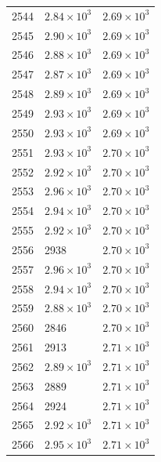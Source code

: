 \begin{table}[H]
\begin{tabular}{lll}
2544 & $\displaystyle 2.84 \times 10^{3}$ & $\displaystyle 2.69 \times 10^{3}$ \\
2545 & $\displaystyle 2.90 \times 10^{3}$ & $\displaystyle 2.69 \times 10^{3}$ \\
2546 & $\displaystyle 2.88 \times 10^{3}$ & $\displaystyle 2.69 \times 10^{3}$ \\
2547 & $\displaystyle 2.87 \times 10^{3}$ & $\displaystyle 2.69 \times 10^{3}$ \\
2548 & $\displaystyle 2.89 \times 10^{3}$ & $\displaystyle 2.69 \times 10^{3}$ \\
2549 & $\displaystyle 2.93 \times 10^{3}$ & $\displaystyle 2.69 \times 10^{3}$ \\
2550 & $\displaystyle 2.93 \times 10^{3}$ & $\displaystyle 2.69 \times 10^{3}$ \\
2551 & $\displaystyle 2.93 \times 10^{3}$ & $\displaystyle 2.70 \times 10^{3}$ \\
2552 & $\displaystyle 2.92 \times 10^{3}$ & $\displaystyle 2.70 \times 10^{3}$ \\
2553 & $\displaystyle 2.96 \times 10^{3}$ & $\displaystyle 2.70 \times 10^{3}$ \\
2554 & $\displaystyle 2.94 \times 10^{3}$ & $\displaystyle 2.70 \times 10^{3}$ \\
2555 & $\displaystyle 2.92 \times 10^{3}$ & $\displaystyle 2.70 \times 10^{3}$ \\
2556 & 2938 & $\displaystyle 2.70 \times 10^{3}$ \\
2557 & $\displaystyle 2.96 \times 10^{3}$ & $\displaystyle 2.70 \times 10^{3}$ \\
2558 & $\displaystyle 2.94 \times 10^{3}$ & $\displaystyle 2.70 \times 10^{3}$ \\
2559 & $\displaystyle 2.88 \times 10^{3}$ & $\displaystyle 2.70 \times 10^{3}$ \\
2560 & 2846 & $\displaystyle 2.70 \times 10^{3}$ \\
2561 & 2913 & $\displaystyle 2.71 \times 10^{3}$ \\
2562 & $\displaystyle 2.89 \times 10^{3}$ & $\displaystyle 2.71 \times 10^{3}$ \\
2563 & 2889 & $\displaystyle 2.71 \times 10^{3}$ \\
2564 & 2924 & $\displaystyle 2.71 \times 10^{3}$ \\
2565 & $\displaystyle 2.92 \times 10^{3}$ & $\displaystyle 2.71 \times 10^{3}$ \\
2566 & $\displaystyle 2.95 \times 10^{3}$ & $\displaystyle 2.71 \times 10^{3}$ \\

\end{tabular}
\end{table}
